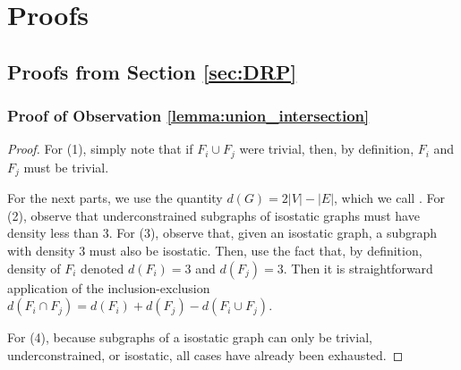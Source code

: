 \section{Proofs}
\label{sec:appendix:a}
\label{sec:appendix:proofs}

\subsection{Proofs from Section \ref{sec:DRP}}









\subsubsection{Proof of Observation \ref{lemma:union_intersection}}

\begin{proof}
For (1), simply note that if $F_i\cup F_j$ were trivial, then, by definition, $F_i$ and $F_j$ must be trivial.

For the next parts, we use the quantity $d(G)=2|V|-|E|$, which we call .
For (2), observe that underconstrained subgraphs of isostatic graphs must have density less than 3.
For (3), observe that, given an isostatic graph, a subgraph with density $3$ must also be isostatic. Then, use the fact that, by definition, density of $F_i$ denoted $d(F_i)=3$ and $d(F_j)=3$. Then it is straightforward application of the inclusion-exclusion $d(F_i\cap F_j)=d(F_i)+d(F_j)-d(F_i\cup F_j)$.

For (4), because subgraphs of a isostatic graph can only be trivial, underconstrained, or isostatic, all cases have already been exhausted.
\end{proof}




